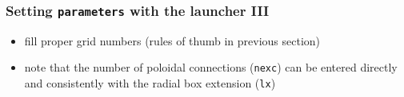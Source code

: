 \documentclass[10pt]{beamer}
\begin{document}
{
\begin{frame}[fragile]
  \frametitle{Setting {\tt parameters} with the launcher III}

\vspace{5.25cm}

\begin{block}{}
\begin{itemize}
\item fill proper grid numbers (rules of thumb in previous section)
\item note that the number of poloidal connections ({\tt nexc}) can be entered directly and consistently with the radial box extension ({\tt lx})
\end{itemize}
\end{block}

\end{frame}
}

\end{document}
